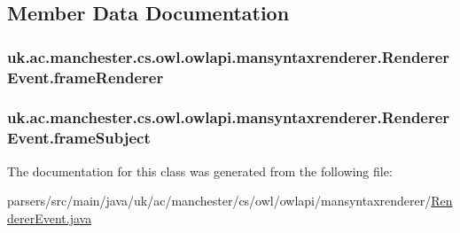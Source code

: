 \subsection{Member Data Documentation}
\hypertarget{classuk_1_1ac_1_1manchester_1_1cs_1_1owl_1_1owlapi_1_1mansyntaxrenderer_1_1_renderer_event_afd2d46fb3ec6624d09e506b29f4af64b}{
\subsubsection[{frame\-Renderer}]{ uk.\-ac.\-manchester.\-cs.\-owl.\-owlapi.\-mansyntaxrenderer.\-Renderer\-Event.\-frame\-Renderer\hspace{0.3cm}{\ttfamily [private]}}}\label{classuk_1_1ac_1_1manchester_1_1cs_1_1owl_1_1owlapi_1_1mansyntaxrenderer_1_1_renderer_event_afd2d46fb3ec6624d09e506b29f4af64b}
\hypertarget{classuk_1_1ac_1_1manchester_1_1cs_1_1owl_1_1owlapi_1_1mansyntaxrenderer_1_1_renderer_event_a846a72e714f893b5e4d8b0d98f315fbc}{
\subsubsection[{frame\-Subject}]{ uk.\-ac.\-manchester.\-cs.\-owl.\-owlapi.\-mansyntaxrenderer.\-Renderer\-Event.\-frame\-Subject\hspace{0.3cm}{\ttfamily [private]}}}\label{classuk_1_1ac_1_1manchester_1_1cs_1_1owl_1_1owlapi_1_1mansyntaxrenderer_1_1_renderer_event_a846a72e714f893b5e4d8b0d98f315fbc}


The documentation for this class was generated from the following file\-:\begin{DoxyCompactItemize}
\item 
parsers/src/main/java/uk/ac/manchester/cs/owl/owlapi/mansyntaxrenderer/\hyperlink{_renderer_event_8java}{Renderer\-Event.\-java}\end{DoxyCompactItemize}
